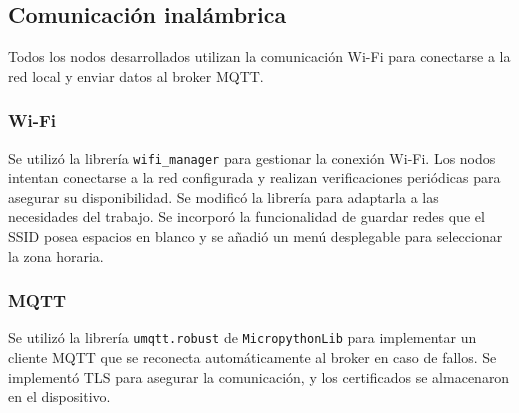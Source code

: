 



\subsection{Comunicación inalámbrica}

Todos los nodos desarrollados utilizan la comunicación Wi-Fi para conectarse a
la red local y enviar datos al broker MQTT.

\subsubsection{Wi-Fi}

Se utilizó la librería \texttt{wifi\_manager} \cite{MicroPythonWifiManager}
para gestionar la conexión Wi-Fi. Los nodos intentan conectarse a la red
configurada y realizan verificaciones periódicas para asegurar su
disponibilidad. Se modificó la librería para adaptarla a las necesidades del
trabajo. Se incorporó la funcionalidad de guardar redes que el SSID posea
espacios en blanco y se añadió un menú desplegable para seleccionar la zona
horaria.

\subsubsection{MQTT}

Se utilizó la librería \texttt{umqtt.robust} de \texttt{MicropythonLib}
\cite{MicropythonLib} para implementar un cliente MQTT que se reconecta
automáticamente al broker en caso de fallos. Se implementó TLS para asegurar la
comunicación, y los certificados se almacenaron en el dispositivo.

